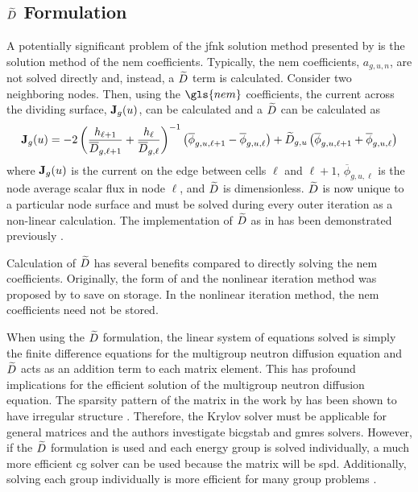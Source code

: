   \subsection{\texorpdfstring{$\widetilde{D}$ Formulation}{D~ Formulation}}
    \label{sec:dtilde_formulation}
    A potentially significant problem of the \gls{jfnk} solution method 
    presented by \citeauthor{qe2paper} is the solution method of the \gls{nem}
    coefficients. Typically, the \gls{nem} coefficients, $a_{g,u,n}$, are not
    solved directly and, instead, a $\widetilde{D}$ term is calculated. Consider two
    neighboring nodes. Then, using the $\gls{nem}$ coefficients, the current
    across the dividing surface, $\mathbf{J}_g(u)$, can be calculated and a
    $\widetilde{D}$ can be calculated as
    \begin{equation}
      \label{eq:dtilde}
      \mathbf{J}_g(u) = 
        -2 \left( \frac{h_{\ell+1}}{\overline{D}_{g,\ell+1}} + 
          \frac{h_{\ell}}{\overline{D}_{g,\ell}} \right)^{-1}
          \left( \overline{\phi}_{g,u,\ell+1} -
          \overline{\phi}_{g,u,\ell} \right) + 
        \widetilde{D}_{g,u} \left( \overline{\phi}_{g,u,\ell+1} +
          \overline{\phi}_{g,u,\ell} \right)
    \end{equation}
    where $\mathbf{J}_g(u)$ is the current on the edge between cells $\ell$ and
    $\ell+1$, $\overline{\phi}_{g,u,\ell}$ is the node average scalar flux in
    node $\ell$, and $\widetilde{D}$ is dimensionless. $\widetilde{D}$ is now unique to a
    particular node surface and must be solved during every outer iteration as a
    non-linear calculation. The implementation of $\widetilde{D}$ as in
     has been demonstrated previously \cite{palmtagThesis}.

    Calculation of $\widetilde{D}$ has several benefits compared to directly solving
    the \gls{nem} coefficients. Originally, the form of  and the
    nonlinear iteration method was proposed by \citeauthor{smith_nonlinear} to
    save on storage. In the nonlinear iteration method, the \gls{nem}
    coefficients need not be stored.

    When using the $\widetilde{D}$ formulation, the linear system of equations solved
    is simply the finite difference equations for the multigroup neutron
    diffusion equation and $\widetilde{D}$ acts as an addition term to each matrix
    element. This has profound implications for the efficient solution of the
    multigroup neutron diffusion equation. The sparsity pattern of the matrix in
    the work by \citeauthor{qe2paper} has been shown to have irregular structure
    \cite{palmtagThesis}. Therefore, the Krylov solver must be applicable for
    general matrices and the authors investigate \gls{bicgstab} and \gls{gmres}
    solvers. However, if the $\widetilde{D}$ formulation is used and each energy group
    is solved individually, a much more efficient \gls{cg} solver can be used
    because the matrix will be \gls{spd}. Additionally, solving each group
    individually is more efficient for many group problems \cite{my_ms_thesis}.

